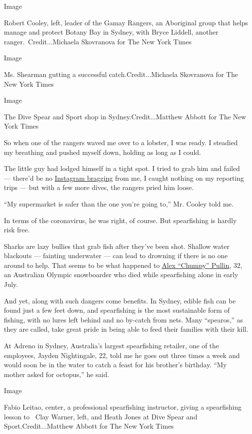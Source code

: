 Image

Robert Cooley, left, leader of the Gamay Rangers, an Aboriginal group
that helps manage and protect Botany Bay in Sydney, with Bryce Liddell,
another ranger.~Credit...Michaela Skovranova for The New York Times

Image

Ms. Shearman gutting a successful catch.Credit...Michaela Skovranova for
The New York Times

Image

The Dive Spear and Sport shop in Sydney.Credit...Matthew Abbott for The
New York Times

So when one of the rangers waved me over to a lobster, I was ready. I
steadied my breathing and pushed myself down, holding as long as I
could.

The little guy had lodged himself in a tight spot. I tried to grab him
and failed --- there'd be no
\href{https://www.instagram.com/p/CDGWKvipsWg/}{Instagram bragging} from
me, I caught nothing on my reporting trips --- but with a few more
dives, the rangers pried him loose.

``My supermarket is safer than the one you're going to,'' Mr. Cooley
told me.

In terms of the coronavirus, he was right, of course. But spearfishing
is hardly risk free.

Sharks are lazy bullies that grab fish after they've been shot. Shallow
water blackouts --- fainting underwater --- can lead to drowning if
there is no one around to help. That seems to be what happened to
\href{https://au.sports.yahoo.com/alex-chumpy-pullin-death-shallow-water-blackout-explained-020035708.html}{Alex
``Chumpy'' Pullin}, 32, an Australian Olympic snowboarder who died while
spearfishing alone in early July.

And yet, along with such dangers come benefits. In Sydney, edible fish
can be found just a few feet down, and spearfishing is the most
sustainable form of fishing, with no lures left behind and no by-catch
from nets. Many ``spearos,'' as they are called, take great pride in
being able to feed their families with their kill.

At Adreno in Sydney, Australia's largest spearfishing retailer, one of
the employees, Jayden Nightingale, 22, told me he goes out three times a
week and would soon be in the water to catch a feast for his brother's
birthday. ``My mother asked for octopus,'' he said.

Image

Fabio Leitao, center, a professional spearfishing instructor, giving a
spearfishing~ lesson to~ Clay Warner, left, and Heath Jones at Dive
Spear and Sport.Credit...Matthew Abbott for The New York Times

